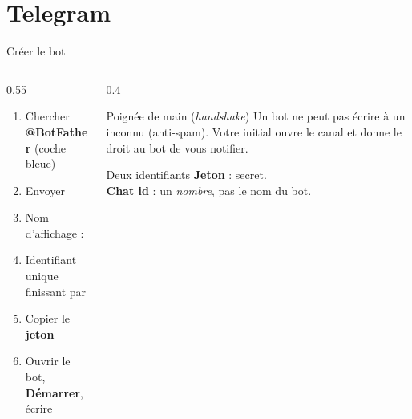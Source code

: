 \documentclass[aspectratio=169,10pt,t]{beamer}
\begin{document}
\section{Telegram}
\begin{frame}[fragile]{Cr\'eer le bot}
\begin{columns}[T]\begin{column}{0.55\textwidth}
\begin{enumerate}
\item Chercher \textbf{@BotFather} (coche bleue)
\item Envoyer 
\item Nom d'affichage : 
\item Identifiant unique finissant par 
\item Copier le \textbf{jeton} 
\item Ouvrir le bot, \textbf{D\'emarrer}, \'ecrire 
\end{enumerate}
\end{column}\begin{column}{0.4\textwidth}
\begin{alertblock}{Poign\'ee de main (\emph{handshake})}
Un bot ne peut pas \'ecrire \`a un inconnu (anti-spam). Votre  initial ouvre le canal et donne le droit au bot de vous notifier.
\end{alertblock}
\begin{block}{Deux identifiants}
\textbf{Jeton} : secret.\\ \textbf{Chat id} : un \emph{nombre}, pas le nom du bot.
\end{block}
\end{column}\end{columns}
\end{frame}
\end{document}
